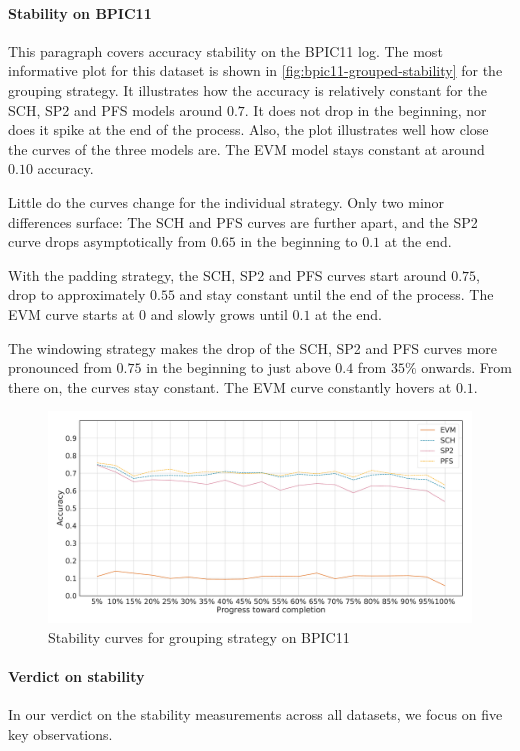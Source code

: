 \paragraph{Stability on BPIC11}
This paragraph covers accuracy stability on the BPIC11 log.
The most informative plot for this dataset is shown in \autoref{fig:bpic11-grouped-stability} for the grouping strategy.
It illustrates how the accuracy is relatively constant for the SCH, SP2 and PFS models around $0.7$.
It does not drop in the beginning, nor does it spike at the end of the process.
Also, the plot illustrates well how close the curves of the three models are.
The EVM model stays constant at around $0.10$ accuracy.

Little do the curves change for the individual strategy.
Only two minor differences surface: The SCH and PFS curves are further apart, and the SP2 curve drops asymptotically from $0.65$ in the beginning to $0.1$ at the end.

With the padding strategy, the SCH, SP2 and PFS curves start around $0.75$, drop to approximately $0.55$ and stay constant until the end of the process.
The EVM curve starts at $0$ and slowly grows until $0.1$ at the end.

The windowing strategy makes the drop of the SCH, SP2 and PFS curves more pronounced from $0.75$ in the beginning to just above $0.4$ from $35\%$ onwards.
From there on, the curves stay constant.
The EVM curve constantly hovers at $0.1$.

\begin{figure}[!htb]
    \centering
    \includegraphics[width=\textwidth]{gfx/bpic2011/grouped_stability.pdf}
    \caption{Stability curves for grouping strategy on BPIC11}
    \label{fig:bpic11-grouped-stability}
\end{figure}

\paragraph{Verdict on stability}
In our verdict on the stability measurements across all datasets, we focus on five key observations.

